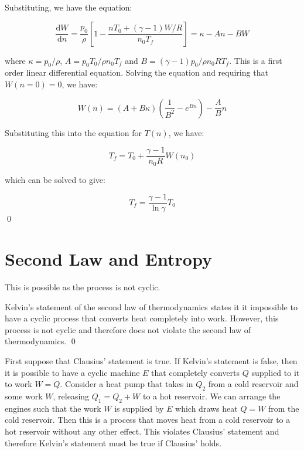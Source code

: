 \documentclass[12pt]{article}
\begin{document}
Substituting, we have the equation:

\begin{equation}
    \frac{\mathrm{d}W}{\mathrm{d}n} = \frac{p_{0}}{\rho} \left[ 1 - \frac{nT_{0} + (\gamma - 1)W/R}{n_{0}T_{f}} \right] = \kappa - An - BW
\end{equation}

where $\kappa = p_{0}/\rho$, $A = p_{0}T_{0}/\rho n_{0}T_{f}$ and $B = (\gamma - 1)p_{0}/\rho n_{0}RT_{f}$. This is a first order linear differential equation. Solving the equation and requiring that $W(n = 0) = 0$, we have:

\begin{equation}
    W(n) = (A + B\kappa) \left( \frac{1}{B^{2}} - e^{Bn} \right) - \frac{A}{B}n
\end{equation}

Substituting this into the equation for $T(n)$, we have:

\begin{equation}
    T_{f} = T_{0} + \frac{\gamma - 1}{n_{0} R} W(n_{0})
\end{equation}

which can be solved to give:

\begin{equation}
    T_{f} = \frac{\gamma - 1}{\ln{\gamma}} T_{0}
\end{equation}
\qed


\pagebreak
\section*{Second Law and Entropy}


This is possible as the process is not cyclic. 

Kelvin's statement of the second law of thermodynamics states it it impossible to have a cyclic process that converts heat completely into work. However, this process is not cyclic and therefore does not violate the second law of thermodynamics.
\qed


First suppose that Clausius' statement is true. If Kelvin's statement is false, then it is possible to have a cyclic machine $E$ that completely converts $Q$ supplied to it to work $W = Q$. Consider a heat pump that takes in $Q_{2}$ from a cold reservoir and some work $W$, releasing $Q_{1} = Q_{2} + W$ to a hot reservoir. We can arrange the engines such that the work $W$ is supplied by $E$ which draws heat $Q = W$ from the cold reservoir. Then this is a process that moves heat from a cold reservoir to a hot reservoir without any other effect. This violates Clausius' statement and therefore Kelvin's statement must be true if Clausius' holds.
\end{document}
